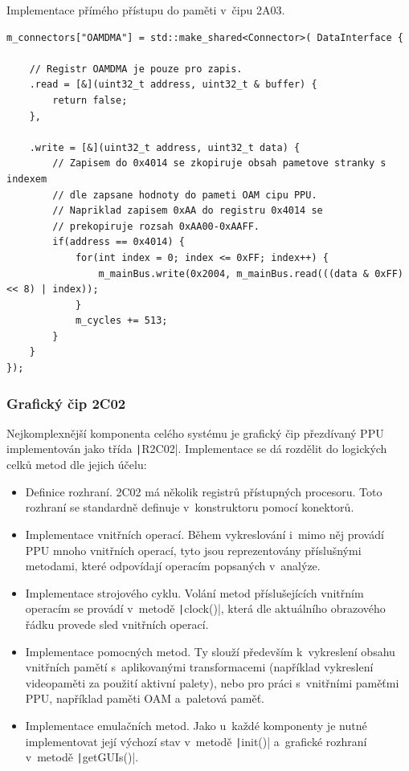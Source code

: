 \begin{listing}
	\caption{Implementace přímého přístupu do paměti v~čipu 2A03.}
	\label{list:use-2a03-dma}
	\begin{verbatim}
m_connectors["OAMDMA"] = std::make_shared<Connector>( DataInterface {

	// Registr OAMDMA je pouze pro zapis.
	.read = [&](uint32_t address, uint32_t & buffer) {
		return false;
	},

	.write = [&](uint32_t address, uint32_t data) {
		// Zapisem do 0x4014 se zkopiruje obsah pametove stranky s indexem
		// dle zapsane hodnoty do pameti OAM cipu PPU.
		// Napriklad zapisem 0xAA do registru 0x4014 se
		// prekopiruje rozsah 0xAA00-0xAAFF.
		if(address == 0x4014) {
			for(int index = 0; index <= 0xFF; index++) {
				m_mainBus.write(0x2004, m_mainBus.read(((data & 0xFF) << 8) | index));
			}
			m_cycles += 513;
		}
	}
});
	\end{verbatim}
\end{listing}

\subsubsection{Grafický čip 2C02}
Nejkomplexnější komponenta celého systému je grafický čip přezdívaný PPU implementován jako třída \texttt|R2C02|. Implementace se dá rozdělit do logických celků metod dle jejich účelu:
\begin{itemize}
	\item Definice rozhraní. 2C02 má několik registrů přístupných procesoru. Toto rozhraní se standardně definuje v~konstruktoru pomocí konektorů.
	\item Implementace vnitřních operací. Během vykreslování i~mimo něj provádí PPU mnoho vnitřních operací, tyto jsou reprezentovány příslušnými metodami, které odpovídají operacím popsaných v~analýze.
	\item Implementace strojového cyklu. Volání metod příslušejících vnitřním operacím se provádí v~metodě \texttt|clock()|, která dle aktuálního obrazového řádku provede sled vnitřních operací.
	\item Implementace pomocných metod. Ty slouží především k~vykreslení obsahu vnitřních pamětí s~aplikovanými transformacemi (například vykreslení videopaměti za použití aktivní palety), nebo pro práci s~vnitřními paměťmi PPU, například paměti OAM a~paletová paměť.
	\item Implementace emulačních metod. Jako u~každé komponenty je nutné implementovat její výchozí stav v~metodě \texttt|init()| a~grafické rozhraní v~metodě \texttt|getGUIs()|.
\end{itemize}

